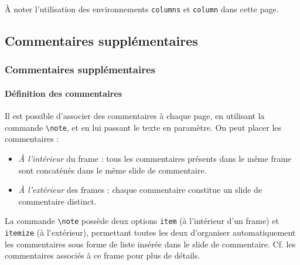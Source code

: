 \documentclass[10pt,    %
    french,             %
    xcolor=table,       %
    envcountsect,       %
    aspectratio=43      %
]{beamer}
\begin{document}
\begin{frame}
    
    
    \medskip
    À noter l'utilisation des environnements \texttt{columns} et \texttt{column} dans cette page.
\end{frame}



\subsection{Commentaires supplémentaires}
\begin{frame}
    \frametitle{Commentaires supplémentaires}
    \framesubtitle{Définition des commentaires}
    
    Il est possible d'associer des commentaires à chaque page, en utilisant la commande \texttt{\textbackslash{}note}, et en lui passant le texte en paramètre. On peut placer les commentaires :
    \begin{itemize}
        \item \textit{À l'intérieur} du frame : tous les commentaires présents dans le même frame sont concaténés dans le même slide de commentaire.
        \item \textit{À l'extérieur} des frames : chaque commentaire constitue un slide de commentaire distinct.
    \end{itemize}
    
    \medskip
    La commande \texttt{\textbackslash{}note} possède deux options \texttt{item} (à l'intérieur d'un frame) et \texttt{itemize} (à l'extérieur), permettant toutes les deux d'organiser automatiquement les commentaires sous forme de liste insérée dans le slide de commentaire. Cf. les commentaires associés à ce frame pour plus de détails.
\end{frame}
\end{document}
